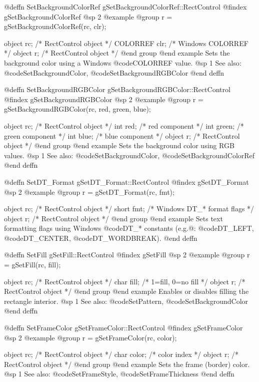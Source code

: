 @deffn {SetBackgroundColorRef} gSetBackgroundColorRef::RectControl
@findex gSetBackgroundColorRef
@sp 2
@example
@group
r = gSetBackgroundColorRef(rc, clr);

object    rc;    /*  RectControl object  */
COLORREF  clr;   /*  Windows COLORREF    */
object    r;     /*  RectControl object  */
@end group
@end example
Sets the background color using a Windows @code{COLORREF} value.
@sp 1
See also:  @code{SetBackgroundColor}, @code{SetBackgroundRGBColor}
@end deffn



@deffn {SetBackgroundRGBColor} gSetBackgroundRGBColor::RectControl
@findex gSetBackgroundRGBColor
@sp 2
@example
@group
r = gSetBackgroundRGBColor(rc, red, green, blue);

object  rc;     /*  RectControl object  */
int     red;    /*  red component       */
int     green;  /*  green component     */
int     blue;   /*  blue component      */
object  r;      /*  RectControl object  */
@end group
@end example
Sets the background color using RGB values.
@sp 1
See also:  @code{SetBackgroundColor}, @code{SetBackgroundColorRef}
@end deffn



@deffn {SetDT_Format} gSetDT_Format::RectControl
@findex gSetDT_Format
@sp 2
@example
@group
r = gSetDT_Format(rc, fmt);

object  rc;    /*  RectControl object        */
short   fmt;   /*  Windows DT_* format flags */
object  r;     /*  RectControl object        */
@end group
@end example
Sets text formatting flags using Windows @code{DT_*} constants
(e.g.@: @code{DT_LEFT}, @code{DT_CENTER}, @code{DT_WORDBREAK}).
@end deffn



@deffn {SetFill} gSetFill::RectControl
@findex gSetFill
@sp 2
@example
@group
r = gSetFill(rc, fill);

object  rc;    /*  RectControl object  */
char    fill;  /*  1=fill, 0=no fill  */
object  r;     /*  RectControl object  */
@end group
@end example
Enables or disables filling the rectangle interior.
@sp 1
See also:  @code{SetPattern}, @code{SetBackgroundColor}
@end deffn



@deffn {SetFrameColor} gSetFrameColor::RectControl
@findex gSetFrameColor
@sp 2
@example
@group
r = gSetFrameColor(rc, color);

object  rc;     /*  RectControl object  */
char    color;  /*  color index         */
object  r;      /*  RectControl object  */
@end group
@end example
Sets the frame (border) color.
@sp 1
See also:  @code{SetFrameStyle}, @code{SetFrameThickness}
@end deffn



